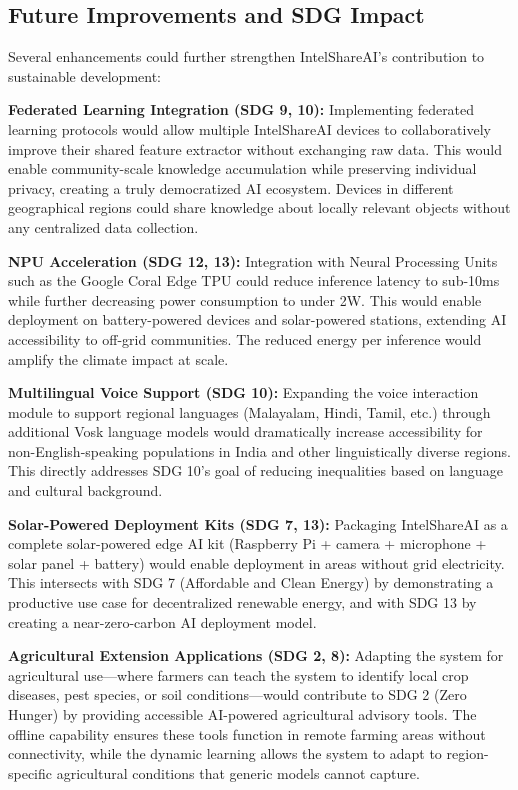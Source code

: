 \documentclass[12pt,a4paper]{report}
\begin{document}
\subsection{Future Improvements and SDG Impact}
Several enhancements could further strengthen IntelShareAI's contribution to sustainable development:

\textbf{Federated Learning Integration (SDG 9, 10):} Implementing federated learning protocols would allow multiple IntelShareAI devices to collaboratively improve their shared feature extractor without exchanging raw data. This would enable community-scale knowledge accumulation while preserving individual privacy, creating a truly democratized AI ecosystem. Devices in different geographical regions could share knowledge about locally relevant objects without any centralized data collection.

\textbf{NPU Acceleration (SDG 12, 13):} Integration with Neural Processing Units such as the Google Coral Edge TPU could reduce inference latency to sub-10ms while further decreasing power consumption to under 2W. This would enable deployment on battery-powered devices and solar-powered stations, extending AI accessibility to off-grid communities. The reduced energy per inference would amplify the climate impact at scale.

\textbf{Multilingual Voice Support (SDG 10):} Expanding the voice interaction module to support regional languages (Malayalam, Hindi, Tamil, etc.) through additional Vosk language models would dramatically increase accessibility for non-English-speaking populations in India and other linguistically diverse regions. This directly addresses SDG 10's goal of reducing inequalities based on language and cultural background.

\textbf{Solar-Powered Deployment Kits (SDG 7, 13):} Packaging IntelShareAI as a complete solar-powered edge AI kit (Raspberry Pi + camera + microphone + solar panel + battery) would enable deployment in areas without grid electricity. This intersects with SDG 7 (Affordable and Clean Energy) by demonstrating a productive use case for decentralized renewable energy, and with SDG 13 by creating a near-zero-carbon AI deployment model.

\textbf{Agricultural Extension Applications (SDG 2, 8):} Adapting the system for agricultural use---where farmers can teach the system to identify local crop diseases, pest species, or soil conditions---would contribute to SDG 2 (Zero Hunger) by providing accessible AI-powered agricultural advisory tools. The offline capability ensures these tools function in remote farming areas without connectivity, while the dynamic learning allows the system to adapt to region-specific agricultural conditions that generic models cannot capture.
\end{document}
